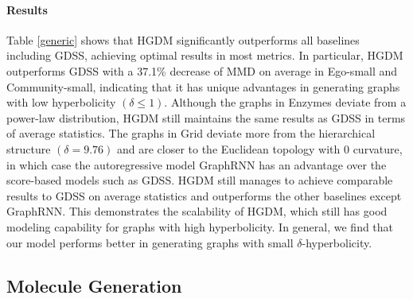 \documentclass[letterpaper]{article} %
\begin{document}
\paragraph{Results}
Table \ref{generic} shows that HGDM significantly outperforms all baselines including GDSS, achieving optimal results in most metrics. In particular, HGDM outperforms GDSS with a 37.1\% decrease of MMD on average in Ego-small and Community-small, indicating that it has unique advantages in generating graphs with low hyperbolicity $(\delta\le 1)$. 
Although the graphs in Enzymes deviate from a power-law distribution,
HGDM still maintains the same results as GDSS in terms of average statistics.
The graphs in Grid deviate more from the hierarchical structure $(\delta=9.76)$ and are closer to the Euclidean topology with 0 curvature, in which case the autoregressive model GraphRNN has an advantage over the score-based models such as GDSS. 
HGDM still manages to achieve comparable results to GDSS on average statistics and outperforms the other baselines except GraphRNN.
This demonstrates the scalability of HGDM, which still has good modeling capability for graphs with high hyperbolicity.
In general, we find that our model performs better in generating graphs with small $\delta$-hyperbolicity. 

\subsection{Molecule Generation}
\end{document}
